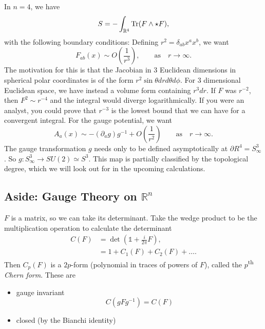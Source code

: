 In $n = 4$, we have
\begin{equation}
  S = - \int_{\mathbb{R}^4} \Tr(F \wedge \star F),
\end{equation}
with the following boundary conditions:
Defining $r^2 = \delta_{ab} x^{a} x^{b}$, we want
\begin{equation}
  F_{ab}(x) \sim O\left(\frac{1}{r^3}\right), \qquad \text{as} \quad r \to \infty.
\end{equation}
The motivation for this is that the Jacobian in $3$ Euclidean dimensions in spherical polar coordinates is of the form $r^2 \sin\theta dr d\theta d\phi$. For $3$ dimensional Euclidean space, we have instead a volume form containing $r^3 dr$.
If $F$ was $r^{-2}$, then $F^2 \sim r^{-4}$ and the integral would diverge logarithmically.
If you were an analyst, you could prove that $r^{-3}$ is the lowest bound that we can have for a convergent integral.
For the gauge potential, we want
\begin{equation}
  A_a(x) \sim- (\partial_{a} g) g^{-1} + O\left(\frac{1}{r^2}\right) \qquad \text{as} \quad r \to \infty.
\end{equation}
The gauge transformation $g$ needs only to be defined asymptotically at $\partial R^4 = S_{\infty}^3$.
So $g \colon S^3_{\infty} \to SU(2) \simeq S^3$.
This map is partially classified by the topological degree, which we will look out for in the upcoming calculations.

\subsection{Aside: Gauge Theory on \texorpdfstring{$\mathbb{R}^n$}{n-dimensional Euclidean Space}}%
\label{sub:aside_gauge_theory_on}

$F$ is a matrix, so we can take its determinant. Take the wedge product to be the multiplication operation to calculate the determinant
\begin{align}
  C(F) &= \det (\mathbb{1} + \frac{i}{2\pi} F), \\
       &= 1 + C_1 (F) + C_2(F) + \dots.
\end{align}
Then $C_p(F)$ is a $2p$-form (polynomial in traces of powers of $F$), called the $p$\textsuperscript{th} \emph{Chern form}.
These are
\begin{itemize}
  \item gauge invariant
    \begin{equation}
      C(g F g^{-1}) = C(F)
    \end{equation}
  \item closed (by the Bianchi identity)
\end{itemize}

